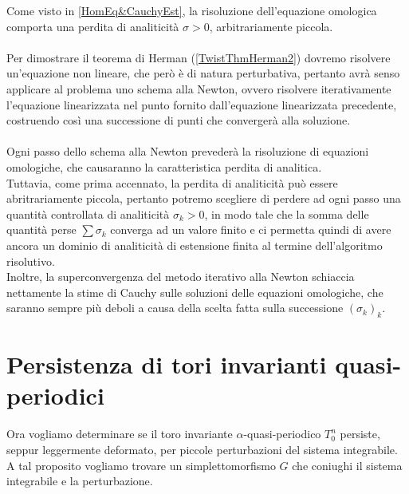 \documentclass[twoside, 11pt]{amsbook}
\newcommand{\0}{{(0)}}
\newcommand{\3}{{(3)}}
\theoremstyle{colonplain}
\theoremstyle{colondefinition}
\theoremstyle{colonremark}
\numberwithin{equation}{chapter}
\begin{document}
Come visto in \ref{HomEq&CauchyEst}, la risoluzione dell'equazione omologica comporta una perdita di analiticità $\sigma > 0$, arbitrariamente piccola. \\ \\
Per dimostrare il teorema di Herman (\ref{TwistThmHerman2}) dovremo risolvere un'equazione non lineare, che però è di natura perturbativa, pertanto avrà senso applicare al problema uno schema alla Newton, ovvero risolvere iterativamente l'equazione linearizzata nel punto fornito dall'equazione linearizzata precedente, costruendo così una successione di punti che convergerà alla soluzione. \\ \\
Ogni passo dello schema alla Newton prevederà la risoluzione di equazioni omologiche, che causaranno la caratteristica perdita di analitica. \\
Tuttavia, come prima accennato, la perdita di analiticità può essere abritrariamente piccola, pertanto potremo scegliere di perdere ad ogni passo una quantità controllata di analiticità $\sigma_k > 0$, in modo tale che la somma delle quantità perse $\sum \sigma_k$ converga ad un valore finito e ci permetta quindi di avere ancora un dominio di analiticità di estensione finita al termine dell'algoritmo risolutivo. \\
Inoltre, la superconvergenza del metodo iterativo alla Newton schiaccia nettamente la stime di Cauchy sulle soluzioni delle equazioni omologiche, che saranno sempre più deboli a causa della scelta fatta sulla successione $(\sigma_k)_k$.

\chapter{Persistenza di tori invarianti quasi-periodici}
Ora vogliamo determinare se il toro invariante $\alpha$-quasi-periodico $T^n_0$ persiste, seppur leggermente deformato, per piccole perturbazioni del sistema integrabile. \\
A tal proposito vogliamo trovare un simplettomorfismo $G$ che coniughi il sistema integrabile e la perturbazione.
\end{document}
